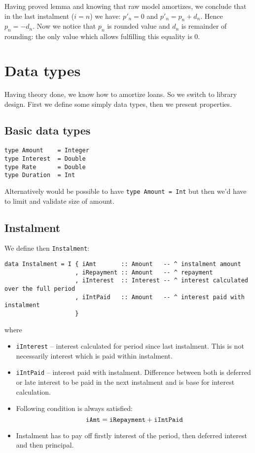 \documentclass[letterpaper,11pt]{article}
\begin{document}
Having proved lemma and knowing that raw model amortizes, we conclude that in the last instalment ($i=n$) we have:
$p'_n = 0$ and $p'_n = p_n + d_n$. Hence $p_n = -d_n$. Now we notice that $p_n$ is rounded value and $d_n$ is remainder of rounding: the only value which allows fulfilling this equality is $0$.



\section {Data types}
Having theory done, we know how to amortize loans. So we switch to library design. First we define some simply data types, then we present properties.


\subsection {Basic data types}

{\small
\begin{verbatim}
type Amount    = Integer
type Interest  = Double
type Rate      = Double
type Duration  = Int
\end{verbatim}
}

Alternatively would be possible to have {\tt type Amount = Int} but then we'd have to limit and validate size of amount.

\subsection{Instalment}

We define then {\tt Instalment}:

{\small
\begin{verbatim}
data Instalment = I { iAmt       :: Amount   -- ^ instalment amount
                    , iRepayment :: Amount   -- ^ repayment
                    , iInterest  :: Interest -- ^ interest calculated over the full period
                    , iIntPaid   :: Amount   -- ^ interest paid with instalment
                    }
\end{verbatim}
}

where\\

\begin{itemize}
\item {\tt iInterest} -- interest calculated for period since last instalment. This is not necessarily interest which is paid within instalment.
\item {\tt iIntPaid} -- interest paid with instalment. Difference between both is deferred or late interest to be paid in the next instalment and is base for interest calculation.
\item Following condition is always satisfied:
\begin{equation}
{\tt iAmt = iRepayment + iIntPaid}
\end{equation}
\item Instalment has to pay off firstly interest of the period, then deferred interest and then principal.
\end{itemize}
\end{document}
